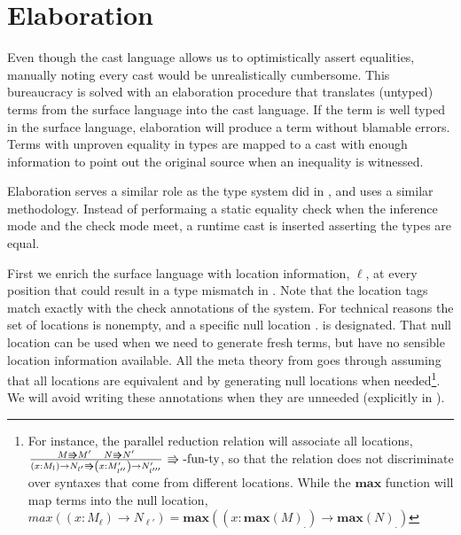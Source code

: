 \section{Elaboration}
 
Even though the cast language allows us to optimistically assert equalities, manually noting every cast would be unrealistically cumbersome.
This bureaucracy is solved with an elaboration procedure that translates (untyped) terms from the surface language into the cast language.
If the term is well typed in the surface language, elaboration will produce a term without blamable errors.
Terms with unproven equality in types are mapped to a cast with enough information to point out the original source when an inequality is witnessed.

Elaboration serves a similar role as the \bidir{} type system did in , and uses a similar methodology.
Instead of performaing a static equality check when the inference mode and the check mode meet, a runtime cast is inserted asserting the types are equal.

 
First we enrich the surface language with location information, $\ell$, at every position that could result in a type mismatch in .
Note that the location tags match exactly with the check annotations of the \bidir{} system.
For technical reasons the set of locations is nonempty, and a specific null location $.$ is designated.
That null location can be used when we need to generate fresh terms, but have no sensible location information available.
All the meta theory from  goes through assuming that all locations are equivalent and by generating null locations when needed\footnote{
 For instance, the parallel reduction relation will associate all locations,
 $\frac{M\Rrightarrow M'\quad N\Rrightarrow N'}{\left(x:M_{l}\right)\rightarrow N_{l'}\Rrightarrow\left(x:M'_{l''}\right)\rightarrow N'_{l'''}}\,\operatorname{\Rrightarrow-fun-ty}$,
 so that the relation does not discriminate over syntaxes that come from different locations.
 While the $\textbf{max}$ function will map terms into the null location,
 $max\left(\left(x:M_{\ell}\right)\rightarrow N_{\ell'}\right)=\textbf{max}\left(\left(x:\textbf{max}\left(M\right)_{.}\right)\rightarrow \textbf{max}\left(N\right)_{.}\right)$
 }.
We will avoid writing these annotations when they are unneeded (explicitly in ).
 
